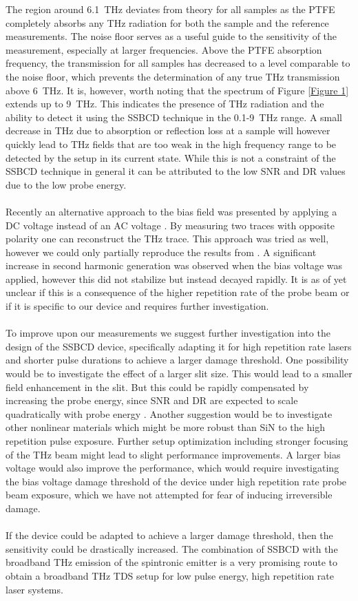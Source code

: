 \documentclass{article}
\begin{document}
The region around \mbox{6.1 THz} deviates from theory for all samples as the PTFE completely absorbs any THz radiation for both the sample and the reference measurements. The noise floor serves as a useful guide to the sensitivity of the measurement, especially at larger frequencies. Above the PTFE absorption frequency, the transmission for all samples has decreased to a level comparable to the noise floor, which prevents the determination of any true THz transmission above \mbox{6 THz}.
It is, however, worth noting that the spectrum of Figure \ref{Figure 1} extends up to \mbox{9 THz}. This indicates the presence of THz radiation and the ability to detect it using the SSBCD technique in the \mbox{0.1-9 THz} range. A small decrease in THz due to absorption or reflection loss at a sample will however quickly lead to THz fields that are too weak in the high frequency range to be detected by the setup in its current state. While this is not a constraint of the SSBCD technique in general it can be attributed to the low SNR and DR values due to the low probe energy.
\\~\\
Recently an alternative approach to the bias field was presented by applying a DC voltage instead of an AC voltage \cite{tomasino-2021}. By measuring two traces with opposite polarity one can reconstruct the THz trace. This approach was tried as well, however we could only partially reproduce the results from \cite{tomasino-2021}. A significant increase in second harmonic generation was observed when the bias voltage was applied, however this did not stabilize but instead decayed rapidly. It is as of yet unclear if this is a consequence of the higher repetition rate of the probe beam or if it is specific to our device and requires further investigation.
\\~\\
To improve upon our measurements we suggest further investigation into the design of the SSBCD device, specifically adapting it for high repetition rate lasers and shorter pulse durations to achieve a larger damage threshold. One possibility would be to investigate the effect of a larger slit size. This would lead to a smaller field enhancement in the slit. But this could be rapidly compensated by increasing the probe energy, since SNR and DR are expected to scale quadratically with probe energy \cite{tomasino-2018}. Another suggestion would be to investigate other nonlinear materials which might be more robust than SiN to the high repetition pulse exposure. Further setup optimization including stronger focusing of the THz beam might lead to slight performance improvements. A larger bias voltage would also improve the performance, which would require investigating the bias voltage damage threshold of the device under high repetition rate probe beam exposure, which we have not attempted for fear of inducing irreversible damage.
\\~\\
If the device could be adapted to achieve a larger damage threshold, then the sensitivity could be drastically increased. The combination of SSBCD with the broadband THz emission of the spintronic emitter is a very promising route to obtain a broadband THz TDS setup for low pulse energy, high repetition rate laser systems.
\end{document}
